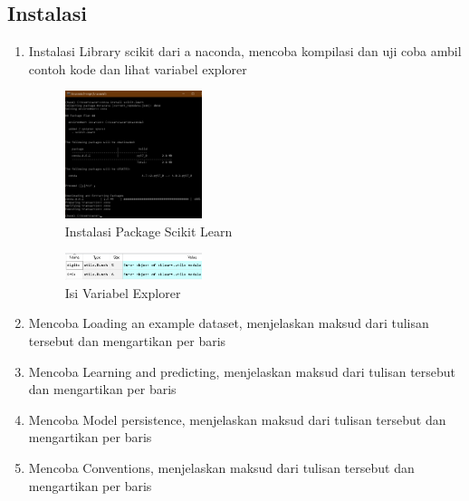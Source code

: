 \subsection{Instalasi}
\begin{enumerate}
	\item Instalasi Library scikit dari a naconda, mencoba kompilasi dan uji coba ambil contoh kode dan lihat variabel explorer
	\hfill\break
	\begin{figure}[H]
		\includegraphics[width=4cm]{figures/1174079/1/1.png}
		\centering
		\caption{Instalasi Package Scikit Learn}
	\end{figure}
	\begin{figure}[H]
		\includegraphics[width=4cm]{figures/1174079/1/2.png}
		\centering
		\caption{Isi Variabel Explorer}
	\end{figure}
	\item Mencoba Loading an example dataset, menjelaskan maksud dari tulisan tersebut dan mengartikan           		  per baris
	\hfill\break
	
	\item Mencoba Learning and predicting, menjelaskan maksud dari tulisan tersebut dan mengartikan per  			  baris
	\hfill\break
	
	\item  Mencoba Model persistence, menjelaskan maksud dari tulisan tersebut dan mengartikan per baris
	\hfill\break
	
	\item Mencoba Conventions, menjelaskan maksud dari tulisan tersebut dan mengartikan per baris
	\hfill\break
	
\end{enumerate}


